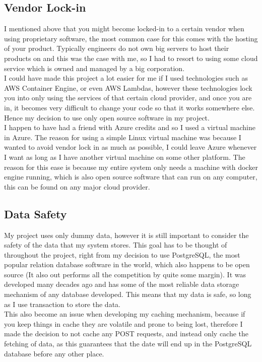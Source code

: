 \documentclass[titlepage]{article}
\begin{document}
\subsection{Vendor Lock-in}
I mentioned above that you might become locked-in to a certain vendor when using proprietary software, the most common case for this comes with the hosting of your product. Typically engineers do not own big servers to host their products on and this was the case with me, so I had to resort to using some cloud service which is owned and managed by a big corporation. \\

I could have made this project a lot easier for me if I used technologies such as AWS Container Engine, or even AWS Lambdas, however these technologies lock you into only using the services of that certain cloud provider, and once you are in, it becomes very difficult to change your code so that it works somewhere else. Hence my decision to use only open source software in my project. \\

I happen to have had a friend with Azure credits and so I used a virtual machine in Azure. The reason for using a simple Linux virtual machine was because I wanted to avoid vendor lock in as much as possible, I could leave Azure whenever I want as long as I have another virtual machine on some other platform. The reason for this ease is because my entire system only needs a machine with docker engine running, which is also open source software that can run on any computer, this can be found on any major cloud provider.

\subsection{Data Safety}
My project uses only dummy data, however it is still important to consider the safety of the data that my system stores. This goal has to be thought of throughout the project, right from my decision to use PostgreSQL, the most popular relation database software in the world, which also happens to be open source (It also out performs all the competition by quite some margin). It was developed many decades ago and has some of the most reliable data storage mechanism of any database developed. This means that my data is safe, so long as I use transaction to store the data. \\

This also become an issue when developing my caching mechanism, because if you keep things in cache they are volatile and prone to being lost, therefore I made the decision to not cache any POST requests, and instead only cache the fetching of data, as this guarantees that the date will end up in the PostgreSQL database before any other place.
\end{document}
